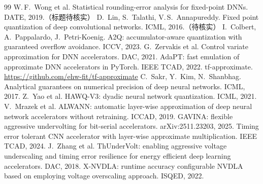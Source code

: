 \documentclass[11pt,a4paper]{ctexart}
\begin{document}
\begin{thebibliography}{99}
 W.\,F.~Wong et al. Statistical rounding-error analysis for fixed-point DNNs. DATE, 2019.（标题待核实）
 D.~Lin, S.~Talathi, V.\,S.~Annapureddy. Fixed point quantization of deep convolutional networks. ICML, 2016.（待核实）
 I.~Colbert, A.~Pappalardo, J.~Petri-Koenig. A2Q: accumulator-aware quantization with guaranteed overflow avoidance. ICCV, 2023.
 G.~Zervakis et al. Control variate approximation for DNN accelerators. DAC, 2021.
 AdaPT: fast emulation of approximate DNN accelerators in PyTorch. IEEE TCAD, 2022.
 tf-approximate. \url{https://github.com/ehw-fit/tf-approximate}
 C.~Sakr, Y.~Kim, N.~Shanbhag. Analytical guarantees on numerical precision of deep neural networks. ICML, 2017.
 Z.~Yao et al. HAWQ-V3: dyadic neural network quantization. ICML, 2021.
 V.~Mrazek et al. ALWANN: automatic layer-wise approximation of deep neural network accelerators without retraining. ICCAD, 2019.
 GAVINA: flexible aggressive undervolting for bit-serial accelerators. arXiv:2511.23203, 2025.
 Timing error tolerant CNN accelerator with layer-wise approximate multiplication. IEEE TCAD, 2024.
 J.~Zhang et al. ThUnderVolt: enabling aggressive voltage underscaling and timing error resilience for energy efficient deep learning accelerators. DAC, 2018.
 X-NVDLA: runtime accuracy configurable NVDLA based on employing voltage overscaling approach. ISQED, 2022.
\end{thebibliography}
\end{document}
